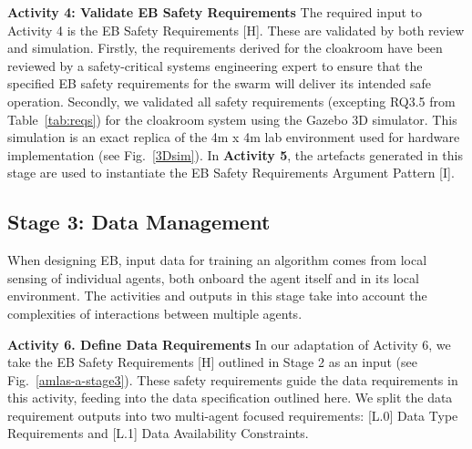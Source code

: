 \documentclass[runningheads]{llncs}
\begin{document}
\noindent\textbf{Activity 4: Validate EB Safety Requirements} The required input to Activity 4 is the EB Safety Requirements [H].  
These
are validated by both review and simulation.
Firstly, the requirements derived for the cloakroom have been reviewed by a safety-critical systems engineering expert to ensure that the specified EB safety requirements for the swarm will deliver its intended safe operation. Secondly, we validated all safety requirements (excepting RQ3.5 from Table~\ref{tab:reqs}) for the cloakroom system using the Gazebo 3D simulator. 
This simulation is an exact replica of the 4m x 4m lab environment used for hardware implementation (see Fig.~\ref{3Dsim}). 
In \textbf{Activity 5}, the artefacts generated in this stage are used to instantiate the EB Safety Requirements Argument Pattern [I].


\subsection{Stage 3: Data Management} \label{framework-stage3}
When designing EB, input data for training an algorithm comes from local sensing of individual agents, both onboard the agent itself and in its local environment. The activities and outputs in this stage take into account the complexities of interactions between multiple agents.


\noindent\textbf{Activity 6. Define Data Requirements} In our adaptation of Activity 6, we take the EB Safety Requirements [H] outlined in Stage 2 as an input (see Fig.~\ref{amlas-a-stage3}). These safety requirements guide the data requirements in this activity, feeding into the data specification outlined here. We split the data requirement outputs into two multi-agent focused requirements: [L.0] Data Type Requirements and [L.1] Data Availability Constraints.
\end{document}
